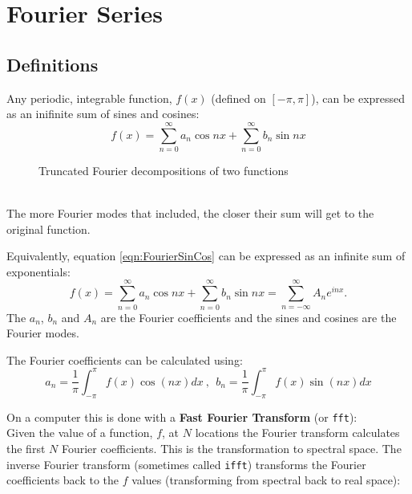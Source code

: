\chapter{Fourier Series}

\section{Definitions}

\begin{minipage}{0.65\linewidth}
Any periodic, integrable function, $f(x)$ (defined on $[-\pi,\pi]$), can be expressed as an inifinite sum of sines and cosines:
\begin{equation}
f(x) = \sum_{n=0}^{\infty} a_n \cos nx + \sum_{n=0}^{\infty}b_n \sin nx
\label{eqn:FourierSinCos}
\end{equation}
\end{minipage}
%
\begin{figure}[ht!]
\vfill \vspace{-3.2in}\hfill
{}
\caption{Truncated Fourier decompositions of two functions}
\label{fig:Fourier}
\end{figure}
\\
The more Fourier modes that included, the closer their sum will get to the original function.

\clearpage

Equivalently, equation \ref{eqn:FourierSinCos} can be expressed as an infinite sum of exponentials:
\begin{equation}
f(x) = \sum_{n=0}^{\infty} a_n \cos nx + \sum_{n=0}^{\infty}b_n \sin nx
     = \sum_{n=-\infty}^{\infty} A_n e^{inx}.
\label{eqn:FourierExp}
\end{equation}
The $a_n$, $b_n$ and $A_n$ are the Fourier coefficients and the sines and cosines are the Fourier modes.

The Fourier coefficients can be calculated using:
\begin{equation*}
a_n = \frac{1}{\pi}\int_{-\pi}^{\pi}f(x)\cos(nx)dx ~, ~~
b_n = \frac{1}{\pi}\int_{-\pi}^{\pi}f(x)\sin(nx)dx
\end{equation*}

On a computer this is done with a {\bf Fast Fourier Transform} (or {\tt fft}):\\
Given the value of a function, $f$, at $N$ locations the Fourier transform calculates the first $N$ Fourier coefficients. This is the transformation to spectral space. The inverse Fourier transform (sometimes called {\tt ifft}) transforms the Fourier coefficients back to the $f$ values (transforming from spectral back to real space):

